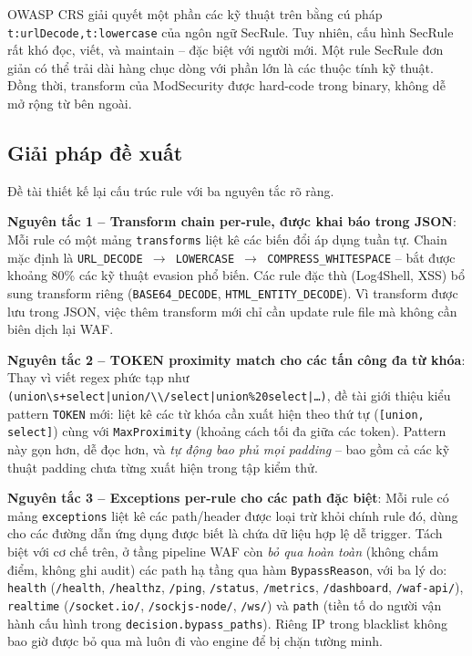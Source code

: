 \documentclass[../DoAn.tex]{subfiles}
\begin{document}
OWASP CRS giải quyết một phần các kỹ thuật trên bằng cú pháp
\texttt{t:urlDecode,t:lowercase} của ngôn ngữ SecRule. Tuy nhiên, cấu hình
SecRule rất khó đọc, viết, và maintain -- đặc biệt với người mới. Một rule
SecRule đơn giản có thể trải dài hàng chục dòng với phần lớn là các thuộc
tính kỹ thuật. Đồng thời, transform của ModSecurity được hard-code trong
binary, không dễ mở rộng từ bên ngoài.

\subsection{Giải pháp đề xuất}
\label{subsection:5.2.2}

Đề tài thiết kế lại cấu trúc rule với ba nguyên tắc rõ ràng.

\textbf{Nguyên tắc 1 -- Transform chain per-rule, được khai báo trong JSON}:
Mỗi rule có một mảng \texttt{transforms} liệt kê các biến đổi áp dụng
tuần tự. Chain mặc định là \texttt{URL\_DECODE \(\to\) LOWERCASE \(\to\)
COMPRESS\_WHITESPACE} -- bắt được khoảng 80\% các kỹ thuật evasion phổ
biến. Các rule đặc thù (Log4Shell, XSS) bổ sung transform riêng
(\texttt{BASE64\_DECODE}, \texttt{HTML\_ENTITY\_DECODE}). Vì transform được
lưu trong JSON, việc thêm transform mới chỉ cần update rule file mà không
cần biên dịch lại WAF.

\textbf{Nguyên tắc 2 -- TOKEN proximity match cho các tấn công đa từ khóa}:
Thay vì viết regex phức tạp như \texttt{(union\textbackslash s+select|union/\textbackslash*\textbackslash*/select|union\%20select|\ldots)},
đề tài giới thiệu kiểu pattern \texttt{TOKEN} mới: liệt kê các từ khóa
cần xuất hiện theo thứ tự (\texttt{[union, select]}) cùng với
\texttt{MaxProximity} (khoảng cách tối đa giữa các token). Pattern này
gọn hơn, dễ đọc hơn, và \textit{tự động bao phủ mọi padding} -- bao gồm cả
các kỹ thuật padding chưa từng xuất hiện trong tập kiểm thử.

\textbf{Nguyên tắc 3 -- Exceptions per-rule cho các path đặc biệt}: Mỗi
rule có mảng \texttt{exceptions} liệt kê các path/header được loại trừ khỏi
chính rule đó, dùng cho các đường dẫn ứng dụng được biết là chứa dữ liệu hợp
lệ dễ trigger. Tách biệt với cơ chế trên, ở tầng pipeline WAF còn \textit{bỏ
qua hoàn toàn} (không chấm điểm, không ghi audit) các path hạ tầng qua hàm
\texttt{BypassReason}, với ba lý do: \texttt{health} (\texttt{/health},
\texttt{/healthz}, \texttt{/ping}, \texttt{/status}, \texttt{/metrics},
\texttt{/dashboard}, \texttt{/waf-api/}), \texttt{realtime}
(\texttt{/socket.io/}, \texttt{/sockjs-node/}, \texttt{/ws/}) và \texttt{path}
(tiền tố do người vận hành cấu hình trong \texttt{decision.bypass\_paths}).
Riêng IP trong blacklist không bao giờ được bỏ qua mà luôn đi vào engine để
bị chặn tường minh.
\end{document}
